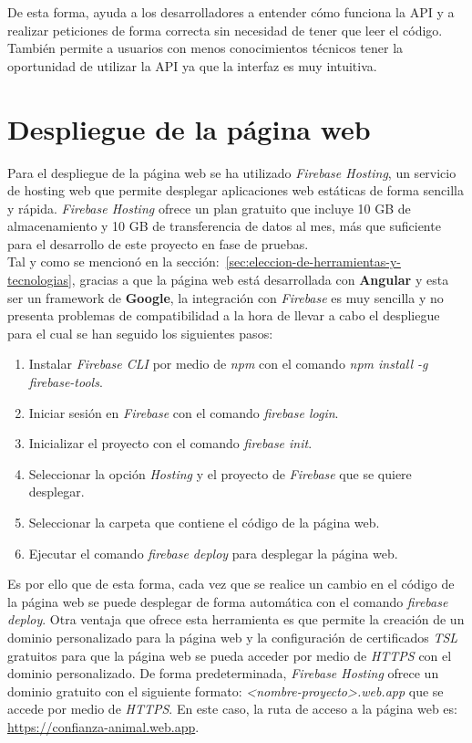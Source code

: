De esta forma, ayuda a los desarrolladores a entender cómo funciona la API y a realizar peticiones de forma correcta sin
necesidad de tener que leer el código. También permite a usuarios con menos conocimientos técnicos tener la oportunidad
de utilizar la API ya que la interfaz es muy intuitiva.


\section{Despliegue de la página web}\label{sec:despliegue-de-la-pagina-web}

Para el despliegue de la página web se ha utilizado \textit{Firebase Hosting}, un servicio de hosting web que permite
desplegar aplicaciones web estáticas de forma sencilla y rápida. \textit{Firebase Hosting} ofrece un plan gratuito que
incluye 10 GB de almacenamiento y 10 GB de transferencia de datos al mes, más que suficiente para el desarrollo de este
proyecto en fase de pruebas. \\

Tal y como se mencionó en la sección:~\ref{sec:eleccion-de-herramientas-y-tecnologias}, gracias a que la página web
está desarrollada con \textbf{Angular} y esta ser un framework de \textbf{Google}, la integración con \textit{Firebase}
es muy sencilla y no presenta problemas de compatibilidad a la hora de llevar a cabo el despliegue para el cual
se han seguido los siguientes pasos:

\begin{enumerate}
    \item Instalar \textit{Firebase CLI} por medio de \textit{npm} con el comando \textit{npm install -g firebase-tools}.
    \item Iniciar sesión en \textit{Firebase} con el comando \textit{firebase login}.
    \item Inicializar el proyecto con el comando \textit{firebase init}.
    \item Seleccionar la opción \textit{Hosting} y el proyecto de \textit{Firebase} que se quiere desplegar.
    \item Seleccionar la carpeta que contiene el código de la página web.
    \item Ejecutar el comando \textit{firebase deploy} para desplegar la página web.
\end{enumerate}

Es por ello que de esta forma, cada vez que se realice un cambio en el código de la página web se puede desplegar de forma automática
con el comando \textit{firebase deploy}. Otra ventaja que ofrece esta herramienta es que permite la creación de un dominio personalizado
para la página web y la configuración de certificados \textit{TSL} gratuitos para que la página web se pueda acceder por medio de
\textit{HTTPS} con el dominio personalizado. De forma predeterminada, \textit{Firebase Hosting} ofrece un dominio gratuito
con el siguiente formato: \textit{<nombre-proyecto>.web.app} que se accede por medio de \textit{HTTPS}. En este caso, la ruta
de acceso a la página web es: \url{https://confianza-animal.web.app}.

